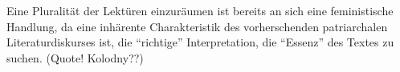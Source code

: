 \begin{comment}
    [Kolodny1980]

"That is, that
the fact of canonization puts any work beyond questions of estab-
lishing its merit and, instead, invites students to offer only increas-
ingly more ingenious readings and interpretations, the purpose of
which is to validate the greatness already imputed by canonization."
--> also sind Readings von Sachen im Kanon meist auch noch langweilig, weil sie nur nochmal beteuern wie toll das Werk ist

\end{comment}
Eine Pluralität der Lektüren einzuräumen ist bereits an sich eine feministische Handlung,
da eine inhärente Charakteristik des vorherschenden patriarchalen Literaturdiskurses ist, die ``richtige'' Interpretation, die ``Essenz'' des Textes zu suchen. (Quote! Kolodny??)
\begin{comment}
feminist criticism very quickly moved
beyond merely "expos[ing] sexism in one work of literature after
another"\cite{Kolodny1980}
--> Tu ich das? Merely exposing sexism in one work of literature? Ist es ok? mach ich vlt sonst was anderes?
\end{comment}
